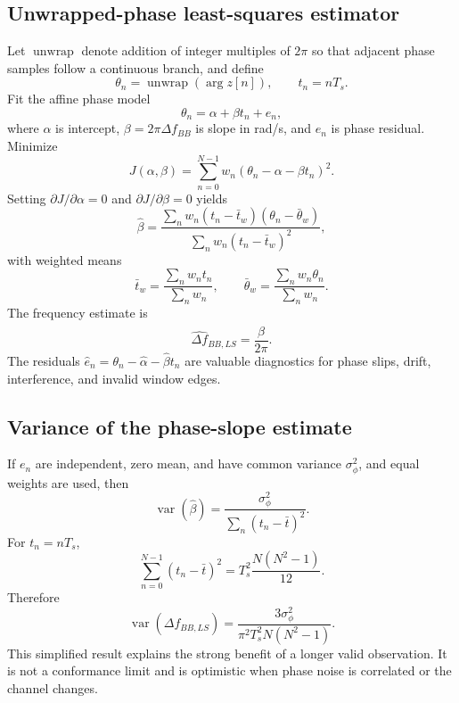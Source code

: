 \documentclass[10pt,a4paper]{article}
\newcommand{\Var}{\operatorname{var}}
\begin{document}
\subsection{Unwrapped-phase least-squares estimator}
Let $\operatorname{unwrap}$ denote addition of integer multiples of $2\pi$ so that adjacent phase samples follow a continuous branch, and define
\begin{equation}
\theta_n=\operatorname{unwrap}(\arg z[n]),\qquad t_n=nT_s.
\end{equation}
Fit the affine phase model
\begin{equation}
\theta_n=\alpha+\beta t_n+e_n,
\label{eq:phaseline}
\end{equation}
where $\alpha$ is intercept, $\beta=2\pi\Delta f_{BB}$ is slope in rad/s, and $e_n$ is phase residual. Minimize
\begin{equation}
J(\alpha,\beta)=\sum_{n=0}^{N-1}w_n(\theta_n-\alpha-\beta t_n)^2.
\end{equation}
Setting $\partial J/\partial\alpha=0$ and $\partial J/\partial\beta=0$ yields
\begin{equation}
\widehat\beta=
\frac{\sum_nw_n(t_n-\bar t_w)(\theta_n-\bar\theta_w)}
{\sum_nw_n(t_n-\bar t_w)^2},
\label{eq:lsslope}
\end{equation}
with weighted means
\begin{equation}
\bar t_w=\frac{\sum_nw_nt_n}{\sum_nw_n},\qquad
\bar\theta_w=\frac{\sum_nw_n\theta_n}{\sum_nw_n}.
\end{equation}
The frequency estimate is
\begin{equation}
\widehat{\Delta f}_{BB,LS}=\frac{\widehat\beta}{2\pi}.
\label{eq:lsfreq}
\end{equation}
The residuals $\widehat e_n=\theta_n-\widehat\alpha-\widehat\beta t_n$ are valuable diagnostics for phase slips, drift, interference, and invalid window edges.

\subsection{Variance of the phase-slope estimate}
If $e_n$ are independent, zero mean, and have common variance $\sigma_\phi^2$, and equal weights are used, then
\begin{equation}
\Var(\widehat\beta)=\frac{\sigma_\phi^2}{\sum_n(t_n-\bar t)^2}.
\end{equation}
For $t_n=nT_s$,
\begin{equation}
\sum_{n=0}^{N-1}(t_n-\bar t)^2
=T_s^2\frac{N(N^2-1)}{12}.
\end{equation}
Therefore
\begin{equation}
\Var(\widehat{\Delta f}_{BB,LS})
=\frac{3\sigma_\phi^2}{\pi^2T_s^2N(N^2-1)}.
\label{eq:lsvariance}
\end{equation}
This simplified result explains the strong benefit of a longer valid observation. It is not a conformance limit and is optimistic when phase noise is correlated or the channel changes.
\end{document}
